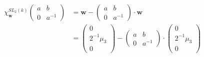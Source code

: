 \begin{align*}
	\chi^{SL_2(k)}_\mathbf{w}\left(\begin{matrix}a & b\\0 & a^{-1}\end{matrix}\right) &= \mathbf{w} - \left(\begin{matrix}a & b\\0 & a^{-1}\end{matrix}\right) \cdot \mathbf{w} \\
	&=
	\left(\begin{matrix}0\\2^{-1}\mu_3\\0\end{matrix}\right)
	-
	\left(\begin{matrix}a & b\\0 & a^{-1}\end{matrix}\right)\cdot
	\left(\begin{matrix}0\\2^{-1}\mu_3\\0\end{matrix}\right) \\

\end{align*}
